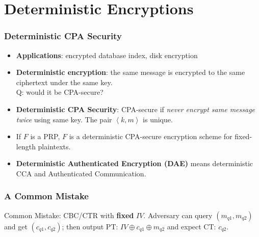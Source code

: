 \section{Deterministic Encryptions}
\begin{frame}\frametitle{Deterministic CPA Security}
\begin{itemize}
\item \textbf{Applications}: encrypted database index, disk encryption
\item \textbf{Deterministic encryption}: the same message is encrypted to the same ciphertext under the same key. \\ \alert{Q: would it be  CPA-secure?}
\item \textbf{Deterministic CPA Security}: CPA-secure if \emph{never encrypt same message twice} using same key. The pair $\left<k,m\right>$ is unique.
\item If $F$ is a PRP, $F$ is a deterministic CPA-secure encryption scheme for fixed-length plaintexts.
\item \textbf{Deterministic Authenticated Encryption (DAE)} means deterministic CCA and Authenticated Communication.
% 
\end{itemize}
\end{frame}
\begin{frame}\frametitle{A Common Mistake}
\begin{exampleblock}{Common Mistake: CBC/CTR with \textbf{fixed} $IV$.}
Adversary can query $(m_{q1}, m_{q2})$ and get $(c_{q1}, c_{q2})$; then output PT: $ IV\oplus c_{q1} \oplus m_{q2}$ and expect CT: $c_{q2}$.
\begin{figure}
  \begin{center}
  
  \end{center}
  \end{figure}
\end{exampleblock}
\end{frame}
